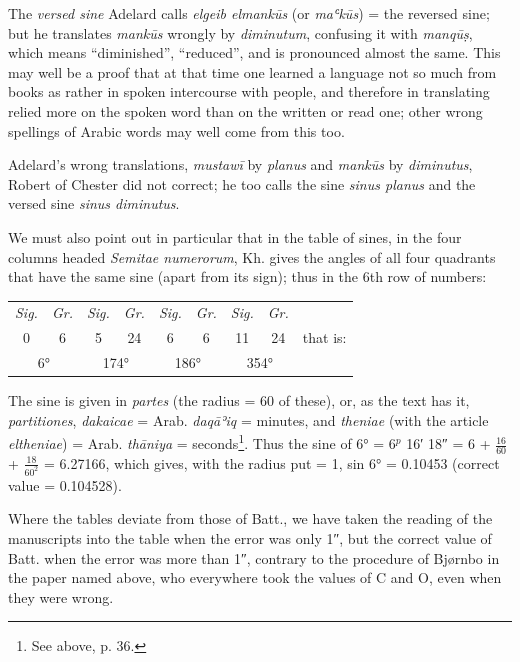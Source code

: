 \documentclass[11pt]{article}
\begin{document}
\par The \emph{versed sine} Adelard calls \emph{elgeib elmankūs} (or \emph{maʿkūs}) = the reversed sine; but he translates \emph{mankūs} wrongly by \emph{diminutum}, confusing it with \emph{manqūṣ}, which means “diminished”, “reduced”, and is pronounced almost the same. This may well be a proof that at that time one learned a language not so much from books as rather in spoken intercourse with people, and therefore in translating relied more on the spoken word than on the written or read one; other wrong spellings of Arabic words may well come from this too.\par
\par Adelard's wrong translations, \emph{mustawī} by \emph{planus} and \emph{mankūs} by \emph{diminutus}, Robert of Chester did not correct; he too calls the sine \emph{sinus planus} and the versed sine \emph{sinus diminutus}.\par
\par We must also point out in particular that in the table of sines, in the four columns headed \emph{Semitae numerorum}, Kh. gives the angles of all four quadrants that have the same sine (apart from its sign); thus in the 6th row of numbers:\par
\begin{center}\small\begin{tabular}{cccccccc|l}
\emph{Sig.} & \emph{Gr.} & \emph{Sig.} & \emph{Gr.} & \emph{Sig.} & \emph{Gr.} & \emph{Sig.} & \emph{Gr.} &  \\
0 & 6 & 5 & 24 & 6 & 6 & 11 & 24 & that is: \\
\multicolumn{2}{c}{6°} & \multicolumn{2}{c}{174°} & \multicolumn{2}{c}{186°} & \multicolumn{2}{c}{354°} &  \\
\end{tabular}\end{center}
\par The sine is given in \emph{partes} (the radius = 60 of these), or, as the text has it, \emph{partitiones}, \emph{dakaicae} = Arab. \emph{daqāʾiq} = minutes, and \emph{theniae} (with the article \emph{eltheniae}) = Arab. \emph{thāniya} = seconds\footnote{See above, p. 36.}. Thus the sine of 6° = 6$^{p}$ 16′ 18″ = 6 + $\tfrac{16}{60}$ + $\tfrac{18}{60^{2}}$ = 6.27166, which gives, with the radius put = 1, sin 6° = 0.10453 (correct value = 0.104528).\par
\par Where the tables deviate from those of Batt., we have taken the reading of the manuscripts into the table when the error was only 1″, but the correct value of Batt. when the error was more than 1″, contrary to the procedure of Bjørnbo in the paper named above, who everywhere took the values of C and O, even when they were wrong.\par
\end{document}
